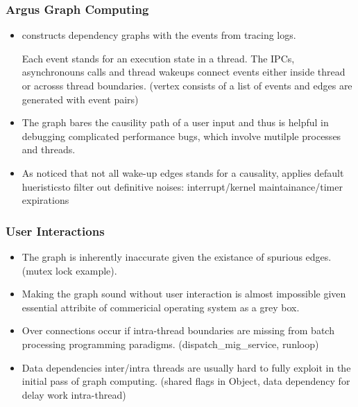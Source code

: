 \subsubsection{Argus Graph Computing}
\begin{itemize}

\item \xxx constructs dependency graphs with the events from tracing logs.

Each event stands for an execution state in a thread. The IPCs, asynchronouns
calls and thread wakeups connect events either inside thread or acrosss thread
boundaries. (vertex consists of a list of events and edges are generated with
event pairs)

\item The graph bares the causility path of a user input and thus is helpful in
debugging complicated performance bugs, which involve mutilple processes and
threads.

\item As noticed that not all wake-up edges stands for a causality, \xxx
applies default hueristicsto filter out definitive noises: interrupt/kernel
maintainance/timer expirations

\end{itemize}

\subsubsection{User Interactions}
\begin{itemize}
\item The graph is inherently inaccurate given the existance of spurious edges. (mutex lock example).
\item Making the graph sound without user interaction is almost impossible given essential attribite of commericial operating system as a grey box.
\item Over connections occur if intra-thread boundaries are missing from batch processing programming paradigms. (dispatch\_mig\_service, runloop)
\item Data dependencies inter/intra threads are usually hard to fully exploit in the initial pass of graph computing. (shared flags in Object, data dependency for delay work intra-thread)
\end{itemize}
